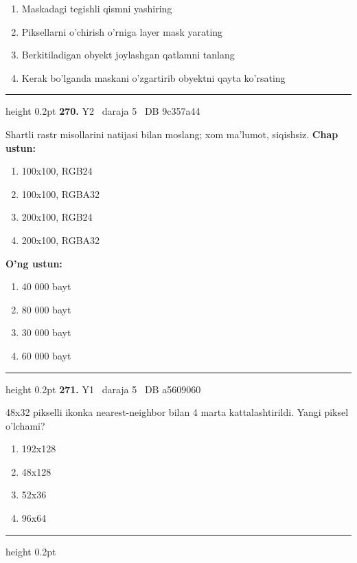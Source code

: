 \documentclass[10pt,a4paper,oneside]{article}
\begin{document}
\begin{enumerate}[label=\Alph*),leftmargin=9mm]
\item Maskadagi tegishli qismni yashiring
\item Piksellarni o'chirish o'rniga layer mask yarating
\item Berkitiladigan obyekt joylashgan qatlamni tanlang
\item Kerak bo'lganda maskani o'zgartirib obyektni qayta ko'rsating
\end{enumerate}
\vspace{2mm}\hrule height 0.2pt \vspace{4mm}
\hypertarget{q270}{\textbf{\color{ink}270.}}  {\color{muted}\scriptsize Y2 \textbullet\ daraja 5 \textbullet\ DB 9c357a44}
\par
Shartli rastr misollarini natijasi bilan moslang; xom ma'lumot, siqishsiz.
\textbf{\footnotesize Chap ustun:}
\begin{enumerate}[label=\arabic*),leftmargin=9mm]
\item 100x100, RGB24
\item 100x100, RGBA32
\item 200x100, RGB24
\item 200x100, RGBA32
\end{enumerate}
\textbf{\footnotesize O'ng ustun:}
\begin{enumerate}[label=\Alph*),leftmargin=9mm]
\item 40 000 bayt
\item 80 000 bayt
\item 30 000 bayt
\item 60 000 bayt
\end{enumerate}
\vspace{2mm}\hrule height 0.2pt \vspace{4mm}
\hypertarget{q271}{\textbf{\color{ink}271.}}  {\color{muted}\scriptsize Y1 \textbullet\ daraja 5 \textbullet\ DB a5609060}
\par
48x32 pikselli ikonka nearest-neighbor bilan 4 marta kattalashtirildi. Yangi piksel o'lchami?
\begin{enumerate}[label=\Alph*),leftmargin=9mm]
\item 192x128
\item 48x128
\item 52x36
\item 96x64
\end{enumerate}
\vspace{2mm}\hrule height 0.2pt \vspace{4mm}
\end{document}
